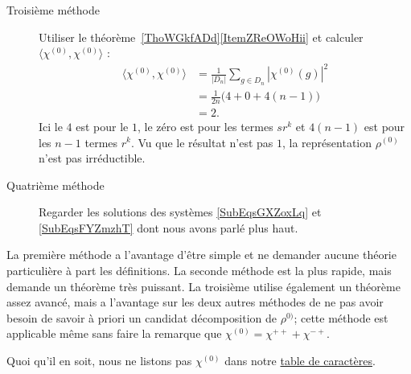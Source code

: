 \begin{enumerate}
\begin{description}
		      \item[Troisième méthode]
		            Utiliser le théorème~\ref{ThoWGkfADd}\ref{ItemZReOWoHii} et calculer \( \langle \chi^{(0)}, \chi^{(0)}\rangle \) :
		            \begin{subequations}
			            \begin{align}
				            \langle \chi^{(0)}, \chi^{(0)}\rangle & =\frac{1}{ | D_n | }\sum_{g\in D_n}| \chi^{(0)}(g) |^2 \\
				                                                  & =\frac{1}{ 2n }\big(4+0+4(n-1)\big)                    \\
				                                                  & =2.
			            \end{align}
		            \end{subequations}
		            Ici le \( 4\) est pour le \( 1\), le zéro est pour les termes \( sr^k\) et \( 4(n-1)\) est pour les \( n-1\) termes \( r^k\). Vu que le résultat n'est pas \( 1\), la représentation \( \rho^{(0)}\) n'est pas irréductible.

		      \item[Quatrième méthode]
		            Regarder les solutions des systèmes \eqref{SubEqsGXZoxLq} et \eqref{SubEqsFYZmzhT} dont nous avons parlé plus haut.

	      \end{description}

	      La première méthode a l'avantage d'être simple et ne demander aucune théorie particulière à part les définitions. La seconde méthode est la plus rapide, mais demande un théorème très puissant. La troisième utilise également un théorème assez avancé, mais a l'avantage sur les deux autres méthodes de ne pas avoir besoin de savoir à priori un candidat décomposition de \( \rho^{0)}\); cette méthode est applicable même sans faire la remarque que \( \chi^{(0)}=\chi^{++}+\chi^{-+}\).

	      Quoi qu'il en soit, nous ne listons pas \( \chi^{(0)}\) dans notre \href{http://fr.wikipedia.org/wiki/Aide:Unicode}{table de caractères}.


\end{enumerate}
